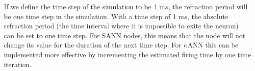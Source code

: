 If we define the time step of the simulation to be 1 m$s$, the refraction period will be one time step in the simulation.
With a time step of 1 m$s$, the absolute refraction period (the time interval where it is impossible to exite the neuron) can be set to one time step. 
For SANN nodes, this means that the node will not change its value for the duration of the next time step. 
For $\kappa$ANN this can be implemented more effective by incrementing the estimated firing time by one time iteration. 















